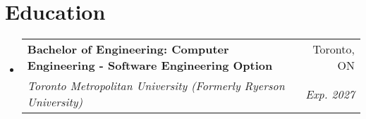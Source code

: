 \documentclass[letterpaper,11pt]{article}
\makeatletter
\newcommand{\resumeSubheading}[4]{
  \vspace{-2pt}\item
    \begin{tabular*}{0.97\textwidth}[t]{l@{\extracolsep{\fill}}r}
      \textbf{#1} & #2 \\
      \textit{\small#3} & \textit{\small #4} \\
    \end{tabular*}\vspace{-7pt}
}
\newcommand{\resumeSubHeadingListStart}{\begin{itemize}[leftmargin=0.15in, label={}]}
\newcommand{\resumeSubHeadingListEnd}{\end{itemize}}
\makeatother
\begin{document}

\section{Education}
  \resumeSubHeadingListStart
    \resumeSubheading
      {Bachelor of Engineering: Computer Engineering - Software Engineering Option}{Toronto, ON}
      {Toronto Metropolitan University (Formerly Ryerson University)}{Exp. 2027}
  \resumeSubHeadingListEnd

\end{document}
